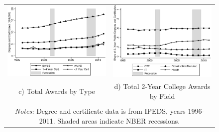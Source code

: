 \begin{figure}[h]
\begin{tabular}{cc}
\includegraphics[scale=0.6]{./figures/aw_byyear.eps}&
\includegraphics[scale=0.6]{./figures/saw_byyear.eps}\\
c) Total Awards by Type&d) Total 2-Year College Awards by Field\\\\
\multicolumn{2}{p{6in}}{\footnotesize \emph{Notes:} Degree and certificate data is from IPEDS, years 1996-2011. Shaded areas indicate NBER recessions.}
\end{tabular}
\label{fig:grenr}
\end{figure}









